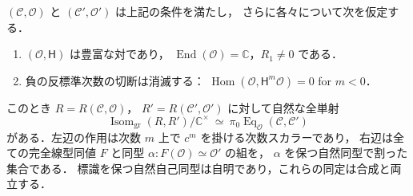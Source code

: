 \begin{proposition}
\label{prop:ncdp-anticanonical-hom}
$(\mathcal C,\mathcal O)$ と $(\mathcal C',\mathcal O')$ は上記の条件を満たし，
さらに各々について次を仮定する．
\begin{enumerate}
\item $(\mathcal O,\mathsf H)$ は豊富な対であり，
      $\operatorname{End}(\mathcal O)=\mathbb C$，$R_1\ne0$ である．
\item 負の反標準次数の切断は消滅する：
      $\operatorname{Hom}(\mathcal O,\mathsf H^m\mathcal O)=0$ for $m<0$．
\end{enumerate}
このとき $R=R(\mathcal C,\mathcal O)$，
$R'=R(\mathcal C',\mathcal O')$ に対して自然な全単射
\[
 \operatorname{Isom}_{\mathrm{gr}}(R,R')/\mathbb C^\times
 \ \simeq\
 \pi_0\operatorname{Eq}_{\mathcal O}(\mathcal C,\mathcal C')
\]
がある．左辺の作用は次数 $m$ 上で $c^m$ を掛ける次数スカラーであり，
右辺は全ての完全線型同値 $F$ と同型
$\alpha:F(\mathcal O)\simeq\mathcal O'$ の組を，
$\alpha$ を保つ自然同型で割った集合である．
標識を保つ自然自己同型は自明であり，これらの同定は合成と両立する．
\end{proposition}
